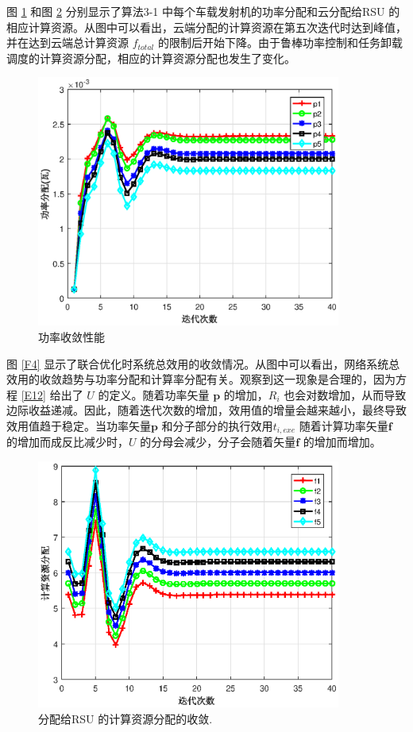 图 \ref{F2} 和图 \ref{F3} 分别显示了算法3-1 中每个车载发射机的功率分配和云分配给RSU 的相应计算资源。从图中可以看出，云端分配的计算资源在第五次迭代时达到峰值，
并在达到云端总计算资源 $f_{total}$ 的限制后开始下降。由于鲁棒功率控制和任务卸载调度的计算资源分配，相应的计算资源分配也发生了变化。
\begin{figure}[H]
\centering
\includegraphics[width=10cm]{figures//chap3//pp.eps}
\caption{功率收敛性能}
\label{F2}
\end{figure}

图 \ref{F4} 显示了联合优化时系统总效用的收敛情况。从图中可以看出，网络系统总效用的收敛趋势与功率分配和计算率分配有关。观察到这一现象是合理的，因为方程 \eqref{E12} 给出了 $U$ 的定义。随着功率矢量 $\mathbf{p}$ 的增加，$R_i$ 也会对数增加，从而导致边际收益递减。因此，随着迭代次数的增加，效用值的增量会越来越小，最终导致效用值趋于稳定。当功率矢量$\mathbf{p}$ 和分子部分的执行效用$t_{i,exe}$ 随着计算功率矢量$\mathbf{f}$ 的增加而成反比减少时，$U$ 的分母会减少，分子会随着矢量$\mathbf{f}$ 的增加而增加。
\begin{figure}[H]
\centering
\includegraphics[width=10cm]{figures//chap3//ff.eps}
\caption{分配给RSU 的计算资源分配的收敛.}
\label{F3}
\end{figure}

